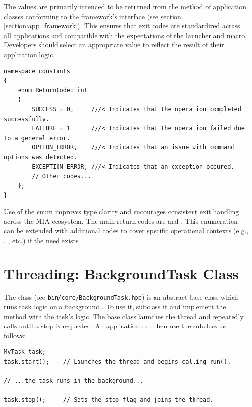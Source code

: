 The  values are primarily intended to be returned from the  method of application classes conforming to the framework's interface (see section \ref{section:app_framework}). This ensures that exit codes are standardized across all applications and compatible with the expectations of the  launcher and  macro. Developers should select an appropriate  value to reflect the result of their application logic.

\begin{lstlisting}[style=cppstyle]
namespace constants
{
	enum ReturnCode: int
	{
		SUCCESS = 0,     ///< Indicates that the operation completed successfully.
		FAILURE = 1      ///< Indicates that the operation failed due to a general error.
		OPTION_ERROR,    ///< Indicates that an issue with command options was detected.
		EXCEPTION_ERROR, ///< Indicates that an exception occured.
		// Other codes...
	};
}
\end{lstlisting}

Use of the  enum improves type clarity and encourages consistent exit handling across the MIA ecosystem. The main return codes are  and . This enumeration can be extended with additional codes to cover specific operational contexts (e.g., , , etc.) if the need exists.















\section{Threading: BackgroundTask Class}\label{section:background_task}

The  class (see \texttt{bin/core/BackgroundTask.hpp}) is an abstract base class which runs task logic on a background . To use it, subclass it and implement the  method with the task's logic. The base class launches the thread and repeatedly calls  until a stop is requested. An application can then use the subclass as follows:
\begin{lstlisting}[style=cppstyle]
MyTask task;
task.start();    // Launches the thread and begins calling run().

// ...the task runs in the background...

task.stop();     // Sets the stop flag and joins the thread.
\end{lstlisting}

